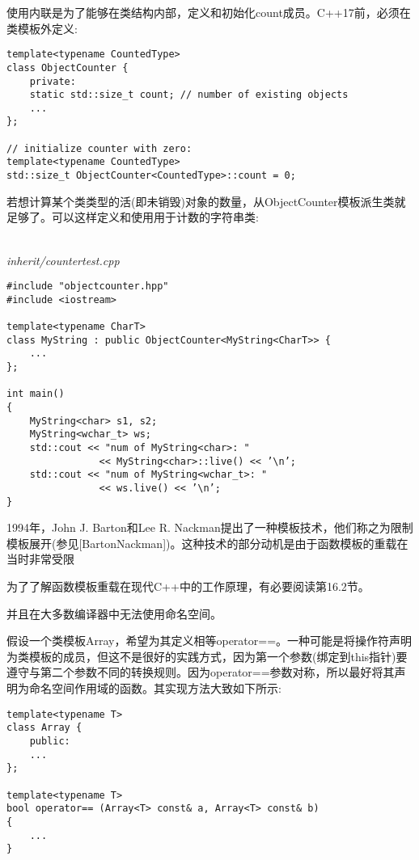 使用内联是为了能够在类结构内部，定义和初始化count成员。C++17前，必须在类模板外定义:

\begin{lstlisting}[style=styleCXX]
template<typename CountedType>
class ObjectCounter {
	private:
	static std::size_t count; // number of existing objects
	...
};

// initialize counter with zero:
template<typename CountedType>
std::size_t ObjectCounter<CountedType>::count = 0;
\end{lstlisting}

若想计算某个类类型的活(即未销毁)对象的数量，从ObjectCounter模板派生类就足够了。可以这样定义和使用用于计数的字符串类:

\hspace*{\fill} \\ %
\noindent
\textit{inherit/countertest.cpp}
\begin{lstlisting}[style=styleCXX]
#include "objectcounter.hpp"
#include <iostream>

template<typename CharT>
class MyString : public ObjectCounter<MyString<CharT>> {
	...
};

int main()
{
	MyString<char> s1, s2;
	MyString<wchar_t> ws;
	std::cout << "num of MyString<char>: "
				<< MyString<char>::live() << ’\n’;
	std::cout << "num of MyString<wchar_t>: "
				<< ws.live() << ’\n’;
}
\end{lstlisting}


1994年，John J. Barton和Lee R. Nackman提出了一种模板技术，他们称之为限制模板展开(参见[BartonNackman])。这种技术的部分动机是由于函数模板的重载在当时非常受限

\begin{tcolorbox}[colback=webgreen!5!white,colframe=webgreen!75!black]
\hspace*{0.75cm}为了了解函数模板重载在现代C++中的工作原理，有必要阅读第16.2节。
\end{tcolorbox}

并且在大多数编译器中无法使用命名空间。

假设一个类模板Array，希望为其定义相等operator==。一种可能是将操作符声明为类模板的成员，但这不是很好的实践方式，因为第一个参数(绑定到this指针)要遵守与第二个参数不同的转换规则。因为operator==参数对称，所以最好将其声明为命名空间作用域的函数。其实现方法大致如下所示:

\begin{lstlisting}[style=styleCXX]
template<typename T>
class Array {
	public:
	...
};

template<typename T>
bool operator== (Array<T> const& a, Array<T> const& b)
{
	...
}
\end{lstlisting}

